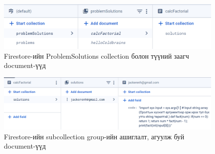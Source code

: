 \begin{figure}[H]
  \centering
  \includegraphics[width=12cm]{img/firestore1.PNG}
  \caption{Firestore-ийн ProblemSolutions collection болон түүний заагч document-үүд}
\end{figure}

\begin{figure}[H]
  \centering
  \includegraphics[width=12cm]{img/firestore2.PNG}
  \caption{Firestore-ийн subcollection group-ийн ашиглалт, агуулж буй document-үүд}
\end{figure}